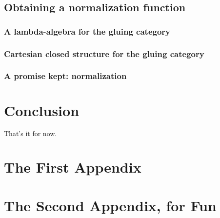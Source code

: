 \documentclass[12pt,twoside]{reedthesis}
\theoremstyle{definition}
\theoremstyle{remark}
\theoremstyle{plain}
\begin{document}
\section{Obtaining a normalization function}
\subsection{A lambda-algebra for the gluing category}
\subsection{Cartesian closed structure for the gluing category}
\subsection{A promise kept: normalization}

\chapter{Conclusion}
\setcounter{chapter}{4}
\setcounter{section}{0}

That's it for now.

\appendix
\chapter{The First Appendix}
\chapter{The Second Appendix, for Fun}



\backmatter%

\nocite{*}


% 
\printbibliography[heading=bibintoc]
% 

\end{document}
